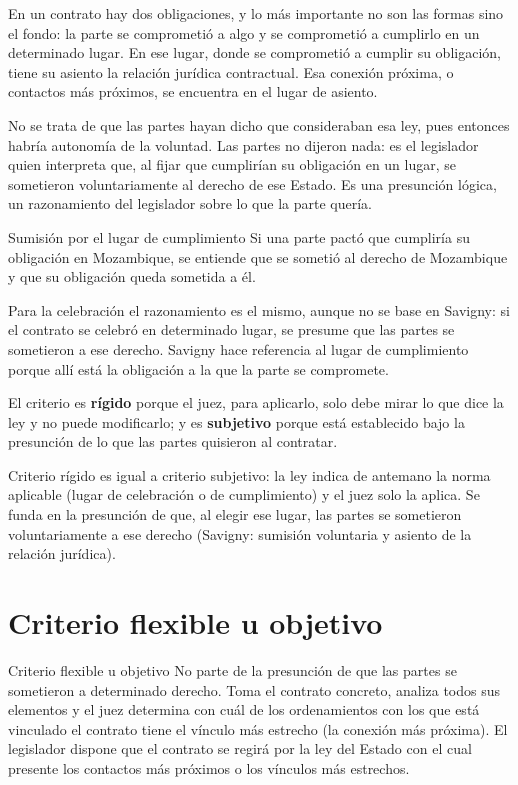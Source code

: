 \documentclass[12pt,oneside]{book}
\begin{document}
En un contrato hay dos obligaciones, y lo más importante no son las formas sino el fondo: la parte se comprometió a algo y se comprometió a cumplirlo en un determinado lugar. En ese lugar, donde se comprometió a cumplir su obligación, tiene su asiento la relación jurídica contractual. Esa conexión próxima, o contactos más próximos, se encuentra en el lugar de asiento.

No se trata de que las partes hayan dicho que consideraban esa ley, pues entonces habría autonomía de la voluntad. Las partes no dijeron nada: es el legislador quien interpreta que, al fijar que cumplirían su obligación en un lugar, se sometieron voluntariamente al derecho de ese Estado. Es una presunción lógica, un razonamiento del legislador sobre lo que la parte quería.

\begin{example}{Sumisión por el lugar de cumplimiento}
Si una parte pactó que cumpliría su obligación en Mozambique, se entiende que se sometió al derecho de Mozambique y que su obligación queda sometida a él.
\end{example}

Para la celebración el razonamiento es el mismo, aunque no se base en Savigny: si el contrato se celebró en determinado lugar, se presume que las partes se sometieron a ese derecho. Savigny hace referencia al lugar de cumplimiento porque allí está la obligación a la que la parte se compromete.

El criterio es \textbf{rígido} porque el juez, para aplicarlo, solo debe mirar lo que dice la ley y no puede modificarlo; y es \textbf{subjetivo} porque está establecido bajo la presunción de lo que las partes quisieron al contratar.

\begin{important}
Criterio rígido es igual a criterio subjetivo: la ley indica de antemano la norma aplicable (lugar de celebración o de cumplimiento) y el juez solo la aplica. Se funda en la presunción de que, al elegir ese lugar, las partes se sometieron voluntariamente a ese derecho (Savigny: sumisión voluntaria y asiento de la relación jurídica).
\end{important}

\section{Criterio flexible u objetivo}

\begin{definition}{Criterio flexible u objetivo}
No parte de la presunción de que las partes se sometieron a determinado derecho. Toma el contrato concreto, analiza todos sus elementos y el juez determina con cuál de los ordenamientos con los que está vinculado el contrato tiene el vínculo más estrecho (la conexión más próxima). El legislador dispone que el contrato se regirá por la ley del Estado con el cual presente los contactos más próximos o los vínculos más estrechos.
\end{definition}
\end{document}
